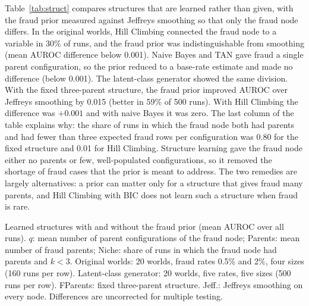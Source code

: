 \documentclass[final,5p,times,authoryear]{elsarticle}
\begin{document}
Table~\ref{tab:struct} compares structures that are learned rather than given, with the fraud prior measured against Jeffreys smoothing so that only the fraud node differs. In the original worlds, Hill Climbing connected the fraud node to a variable in 30\% of runs, and the fraud prior was indistinguishable from smoothing (mean AUROC difference below 0.001). Naive Bayes and TAN gave fraud a single parent configuration, so the prior reduced to a base-rate estimate and made no difference (below 0.001). The latent-class generator showed the same division. With the fixed three-parent structure, the fraud prior improved AUROC over Jeffreys smoothing by 0.015 (better in 59\% of 500 runs). With Hill Climbing the difference was $+0.001$ and with naive Bayes it was zero. The last column of the table explains why: the share of runs in which the fraud node both had parents and had fewer than three expected fraud rows per configuration was 0.80 for the fixed structure and 0.01 for Hill Climbing. Structure learning gave the fraud node either no parents or few, well-populated configurations, so it removed the shortage of fraud cases that the prior is meant to address. The two remedies are largely alternatives: a prior can matter only for a structure that gives fraud many parents, and Hill Climbing with BIC does not learn such a structure when fraud is rare.

\begin{table}[H]
\centering\footnotesize
\begin{adjustbox}{max width=\linewidth}\end{adjustbox}
\caption{Learned structures with and without the fraud prior (mean AUROC over all runs). $q$: mean number of parent configurations of the fraud node; Parents: mean number of fraud parents; Niche: share of runs in which the fraud node had parents and $k<3$. Original worlds: 20 worlds, fraud rates 0.5\% and 2\%, four sizes (160 runs per row). Latent-class generator: 20 worlds, five rates, five sizes (500 runs per row). FParents: fixed three-parent structure. Jeff.: Jeffreys smoothing on every node. Differences are uncorrected for multiple testing.}\label{tab:struct}
\end{table}
\end{document}
